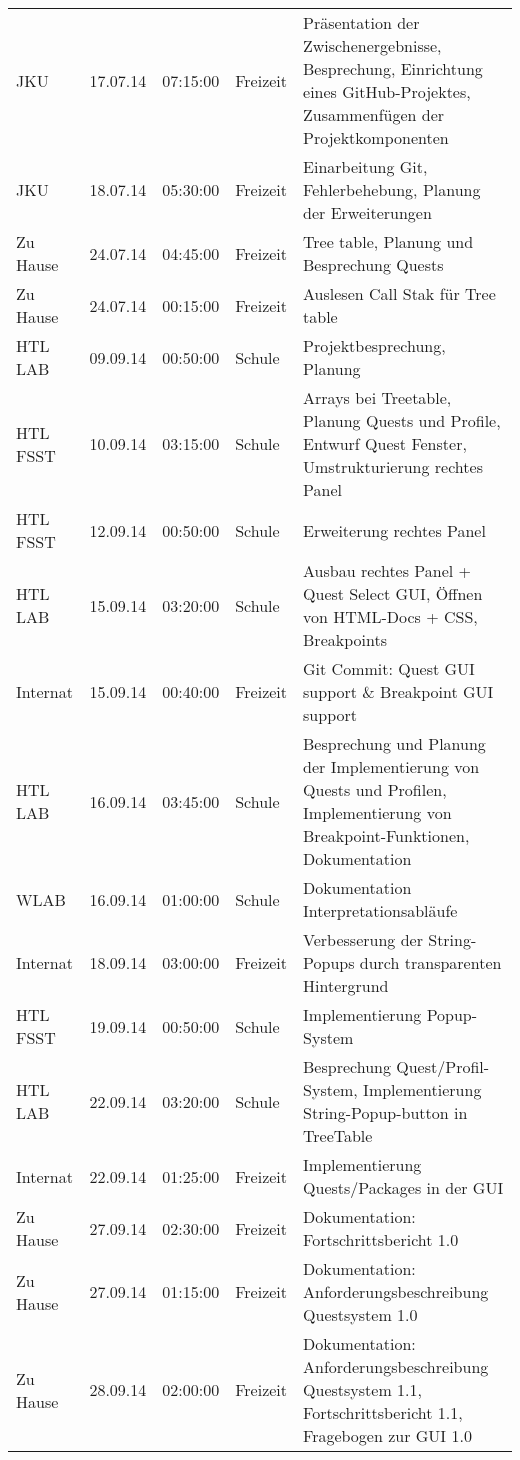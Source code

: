 \begin{small}
\begin{longtable}{ p{} p{} p{} p{} p{}}
JKU	& 17.07.14	& 07:15:00	& Freizeit	& Pr\"asentation der Zwischenergebnisse, Besprechung, Einrichtung eines GitHub-Projektes, Zusammenf\"ugen der Projektkomponenten \\
JKU	& 18.07.14	& 05:30:00	& Freizeit	& Einarbeitung Git, Fehlerbehebung, Planung der Erweiterungen \\
Zu Hause	& 24.07.14	& 04:45:00	& Freizeit	& Tree table, Planung und Besprechung Quests \\
Zu Hause	& 24.07.14	& 00:15:00	& Freizeit	& Auslesen Call Stak f\"ur Tree table \\
HTL LAB	& 09.09.14	& 00:50:00	& Schule	& Projektbesprechung, Planung \\
HTL FSST	& 10.09.14	& 03:15:00	& Schule	& Arrays bei Treetable, Planung Quests und Profile, Entwurf Quest Fenster, Umstrukturierung rechtes Panel \\
HTL FSST	& 12.09.14	& 00:50:00	& Schule	& Erweiterung rechtes Panel \\
HTL LAB	& 15.09.14	& 03:20:00	& Schule	& Ausbau rechtes Panel + Quest Select GUI, \"Offnen von HTML-Docs + CSS, Breakpoints \\
Internat	& 15.09.14	& 00:40:00	& Freizeit	& Git Commit: Quest GUI support \& Breakpoint GUI support \\
HTL LAB	& 16.09.14	& 03:45:00	& Schule	& Besprechung und Planung der Implementierung von Quests und Profilen, Implementierung von Breakpoint-Funktionen, Dokumentation \\
WLAB	& 16.09.14	& 01:00:00	& Schule	& Dokumentation Interpretationsabl\"aufe \\
Internat	& 18.09.14	& 03:00:00	& Freizeit	& Verbesserung der String-Popups durch transparenten Hintergrund \\
HTL FSST	& 19.09.14	& 00:50:00	& Schule	& Implementierung Popup-System \\
HTL LAB	& 22.09.14	& 03:20:00	& Schule	& Besprechung Quest/Profil-System, Implementierung String-Popup-button in TreeTable \\
Internat	& 22.09.14	& 01:25:00	& Freizeit	& Implementierung Quests/Packages in der GUI \\
Zu Hause	& 27.09.14	& 02:30:00	& Freizeit	& Dokumentation: Fortschrittsbericht 1.0 \\
Zu Hause	& 27.09.14	& 01:15:00	& Freizeit	& Dokumentation: Anforderungsbeschreibung Questsystem 1.0 \\
Zu Hause	& 28.09.14	& 02:00:00	& Freizeit	& Dokumentation: Anforderungsbeschreibung Questsystem 1.1, Fortschrittsbericht 1.1, Fragebogen zur GUI 1.0 \\

\end{longtable}
\end{small}
